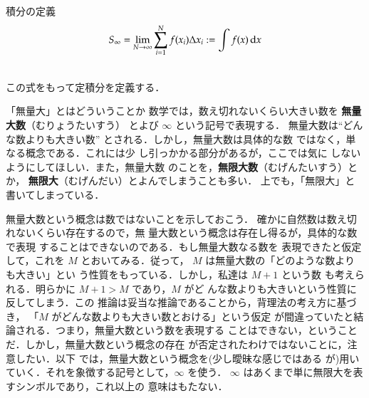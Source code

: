                 \begin{itembox}[l]{積分の定義}
                \begin{align}
                S_{\infty}=\lim_{N\rightarrow  \infty}\sum_{i=1}^{N} f(x_{i})\Delta x_{i}
                 := \int f(x)\,\mathrm{d} x
                \end{align}
                \end{itembox}\\

                この式をもって定積分を定義する．

                \begin{memo}{「無量大」とはどういうことか}
                    数学では，数え切れないくらい大きい数を \textbf{無量大数}（むりょうたいすう）
                    とよび $\infty$ という記号で表現する．
                    無量大数は“どんな数よりも大きい数”
                    とされる．しかし，無量大数は具体的な数
                    ではなく，単なる概念である．これには少
                    し引っかかる部分があるが，ここでは気に
                    しないようにしてほしい．また，無量大数
                    のことを，\textbf{無限大数}（むげんたいすう）とか，
                    \textbf{無限大}（むげんだい）とよんでしまうことも多い．
                    上でも，「無限大」と書いてしまっている．

                    無量大数という概念は数ではないことを示しておこう．
                    確かに自然数は数え切れないくらい存在するので，無
                    量大数という概念は存在し得るが，具体的な数で表現
                    することはできないのである．もし無量大数なる数を
                    表現できたと仮定して，これを $M$ とおいてみる．従って，
                    $M$ は無量大数の「どのような数よりも大きい」とい
                    う性質をもっている．しかし，私達は $M+1$ という数
                    も考えられる．明らかに $M+1>M$ であり，$M$ がど
                    んな数よりも大きいという性質に反してしまう．この
                    推論は妥当な推論であることから，背理法の考え方に基づき，
                    「$M$ がどんな数よりも大きい数とおける」という仮定
                    が間違っていたと結論される．つまり，無量大数という数を表現する
                    ことはできない，ということだ．しかし，無量大数という概念の存在
                    が否定されたわけではないことに，注意したい．以下
                    では，無量大数という概念を(少し曖昧な感じではある
                    が)用いていく．それを象徴する記号として，$\infty$ を使う．
                    $\infty$ はあくまで単に無限大を表すシンボルであり，これ以上の
                    意味はもたない．
                \end{memo}

